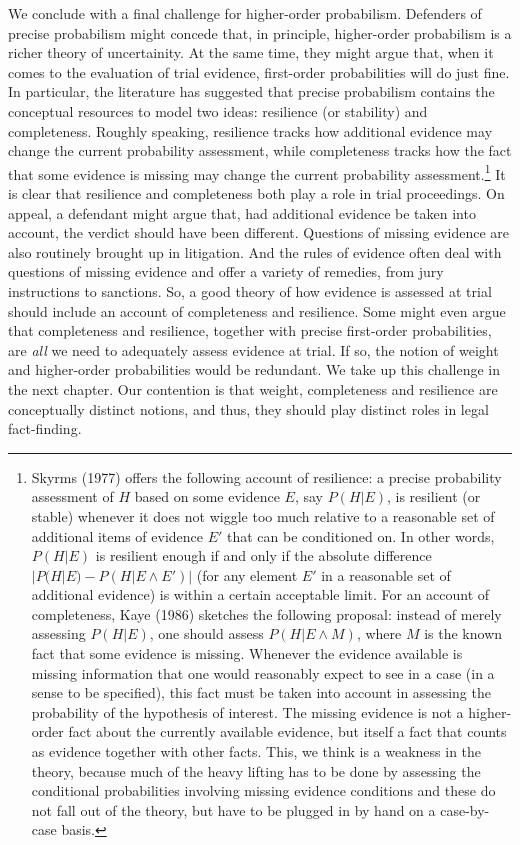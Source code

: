 \documentclass[
  10pt,
  dvipsnames,enabledeprecatedfontcommands]{scrartcl}
\begin{document}
We conclude with a final challenge for higher-order probabilism.
Defenders of precise probabilism might concede that, in principle,
higher-order probabilism is a richer theory of uncertainity. At the same
time, they might argue that, when it comes to the evaluation of trial
evidence, first-order probabilities will do just fine. In particular,
the literature has suggested that precise probabilism contains the
conceptual resources to model two ideas: resilience (or stability) and
completeness. Roughly speaking, resilience tracks how additional
evidence may change the current probability assessment, while
completeness tracks how the fact that some evidence is missing may
change the current probability assessment.\footnote{ Skyrms (1977)
  offers the following account of resilience: a precise probability
  assessment of \(H\) based on some evidence \(E\), say
  \(P(H \vert E)\), is resilient (or stable) whenever it does not wiggle
  too much relative to a reasonable set of additional items of evidence
  \(E'\) that can be conditioned on. In other words, \(P(H \vert E)\) is
  resilient enough if and only if the absolute difference
  \(| P(H | E) - P(H \vert E \wedge E')|\) (for any element \(E'\) in a
  reasonable set of additional evidence) is within a certain acceptable
  limit. For an account of completeness, Kaye (1986) sketches the
  following proposal: instead of merely assessing \(P(H \vert E)\), one
  should assess \(P(H \vert E \wedge M)\), where \(M\) is the known fact
  that some evidence is missing. Whenever the evidence available is
  missing information that one would reasonably expect to see in a case
  (in a sense to be specified), this fact must be taken into account in
  assessing the probability of the hypothesis of interest. The missing
  evidence is not a higher-order fact about the currently available
  evidence, but itself a fact that counts as evidence together with
  other facts. This, we think is a weakness in the theory, because much
  of the heavy lifting has to be done by assessing the conditional
  probabilities involving missing evidence conditions and these do not
  fall out of the theory, but have to be plugged in by hand on a
  case-by-case basis.} It is clear that resilience and completeness both
play a role in trial proceedings. On appeal, a defendant might argue
that, had additional evidence be taken into account, the verdict should
have been different. Questions of missing evidence are also routinely
brought up in litigation. And the rules of evidence often deal with
questions of missing evidence and offer a variety of remedies, from jury
instructions to sanctions. So, a good theory of how evidence is assessed
at trial should include an account of completeness and resilience. Some
might even argue that completeness and resilience, together with precise
first-order probabilities, are \emph{all} we need to adequately assess
evidence at trial. If so, the notion of weight and higher-order
probabilities would be redundant. We take up this challenge in the next
chapter. Our contention is that weight, completeness and resilience are
conceptually distinct notions, and thus, they should play distinct roles
in legal fact-finding.
\end{document}

